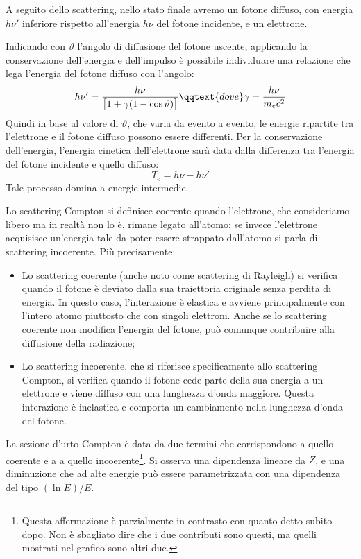 A seguito dello scattering, nello stato finale avremo un fotone diffuso, con energia $h\nu'$ inferiore rispetto all'energia $h\nu$ del fotone incidente, e un elettrone.

Indicando con $\vartheta$ l'angolo di diffusione del fotone uscente, applicando la conservazione dell'energia e dell'impulso è possibile individuare una relazione che lega l'energia del fotone diffuso con l'angolo:
\begin{equation*}
    h\nu'=\frac{h\nu}{\big[1 + \gamma (1 - \cos{\vartheta})\big]}
    \qqtext{dove}
    \gamma=\frac{h\nu}{m_ec^2}
\end{equation*}
Quindi in base al valore di $\vartheta$, che varia da evento a evento, le energie ripartite tra l'elettrone e il fotone diffuso possono essere differenti.
Per la conservazione dell'energia, l'energia cinetica dell'elettrone sarà data dalla differenza tra l'energia del fotone incidente e quello diffuso:
\begin{equation*}
    T_e=h\nu - h\nu'
\end{equation*}
Tale processo domina a energie intermedie.

Lo scattering Compton si definisce coerente quando l'elettrone, che consideriamo libero ma in realtà non lo è, rimane legato all'atomo; se invece l'elettrone acquisisce un'energia tale da poter essere strappato dall'atomo si parla di scattering incoerente. Più precisamente:

\begin{itemize}
    \item Lo scattering coerente (anche noto come scattering di Rayleigh) si verifica quando il fotone è deviato dalla sua traiettoria originale senza perdita di energia. In questo caso, l'interazione è elastica e avviene principalmente con l'intero atomo piuttosto che con singoli elettroni. Anche se lo scattering coerente non modifica l'energia del fotone, può comunque contribuire alla diffusione della radiazione;
    \item Lo scattering incoerente, che si riferisce specificamente allo scattering Compton, si verifica quando il fotone cede parte della sua energia a un elettrone e viene diffuso con una lunghezza d'onda maggiore. Questa interazione è inelastica e comporta un cambiamento nella lunghezza d'onda del fotone.
\end{itemize}

La sezione d'urto Compton è data da due termini che corrispondono a quello coerente e a a quello incoerente\footnote{Questa affermazione è parzialmente in contrasto con quanto detto subito dopo. Non è sbagliato dire che i due contributi sono questi, ma quelli mostrati nel grafico sono altri due.}. Si osserva una dipendenza lineare da $Z$, e una diminuzione che ad alte energie può essere parametrizzata con una dipendenza del tipo $(\ln E)/E$.

